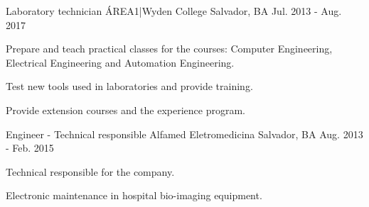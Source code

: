 \begin{cventries}
    
  \cventry
    {Laboratory technician} %
    {ÁREA1|Wyden College} %
    {Salvador, BA} %
    {Jul. 2013 - Aug. 2017} %
    {
      \begin{cvitems} %
        \item {Prepare and teach practical classes for the courses: Computer Engineering, Electrical Engineering and Automation Engineering.}
        \item {Test new tools used in laboratories and provide training.}
        \item {Provide extension courses and the experience program.}
      \end{cvitems}
    }

  \cventry
    {Engineer - Technical responsible} %
    {Alfamed Eletromedicina} %
    {Salvador, BA} %
    {Aug. 2013 - Feb. 2015} %
    {
      \begin{cvitems} %
        \item {Technical responsible for the company.}
        \item {Electronic maintenance in hospital bio-imaging equipment.}
      \end{cvitems}
    }
    


\end{cventries}
